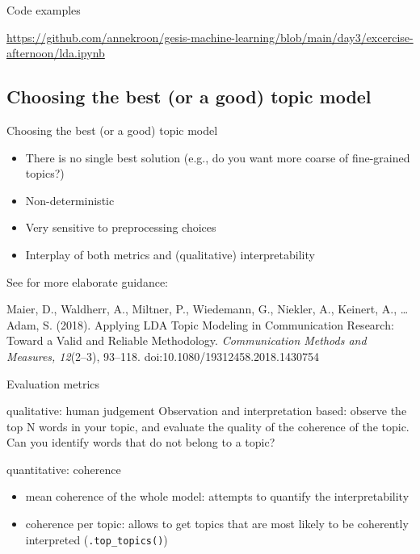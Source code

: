 \documentclass[handout]{beamer}
\begin{document}
\begin{frame}[plain]{Code examples}
	
	
	\url{https://github.com/annekroon/gesis-machine-learning/blob/main/day3/excercise-afternoon/lda.ipynb}
\end{frame}



\subsection{Choosing the best (or a good) topic model}

\begin{frame}{Choosing the best (or a good) topic model}
	\begin{itemize}
		\item There is no single best solution (e.g., do you want more coarse of fine-grained topics?)
		\item Non-deterministic
		\item Very sensitive to preprocessing choices
		\item Interplay of both metrics and (qualitative) interpretability 
	\end{itemize}
	
	See for more elaborate guidance:
	
	\tiny{Maier, D., Waldherr, A., Miltner, P., Wiedemann, G., Niekler, A., Keinert, A., \ldots Adam, S. (2018). Applying LDA Topic Modeling in Communication Research: Toward a Valid and Reliable Methodology. \textit{Communication Methods and Measures, 12}(2--3), 93--118. doi:10.1080/19312458.2018.1430754}
	
\end{frame}



\begin{frame}{Evaluation metrics}
	\begin{block}{qualitative: human judgement}
	Observation and interpretation based: observe the top N words in your topic, and evaluate the quality of the coherence of the topic.  Can you identify words that do not belong to a topic?
	\end{block}
	
	\pause 
	\begin{block}{quantitative: coherence}
		\begin{itemize}
			\item mean coherence of the whole model: attempts to quantify the interpretability
			\item coherence per topic: allows to get topics that are most likely to be coherently interpreted (\texttt{.top\_topics()})
		\end{itemize}
	\end{block}
	
\end{frame}
\end{document}
